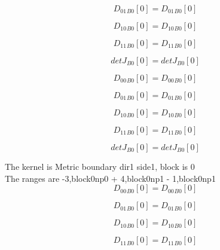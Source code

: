 \documentclass{article}
\begin{document}
\begin{dmath}{D_{01}{_{B0}}}[{0}] = {D_{01}{_{B0}}}[{0}]\end{dmath}

\begin{dmath}{D_{10}{_{B0}}}[{0}] = {D_{10}{_{B0}}}[{0}]\end{dmath}

\begin{dmath}{D_{11}{_{B0}}}[{0}] = {D_{11}{_{B0}}}[{0}]\end{dmath}

\begin{dmath}{detJ{_{B0}}}[{0}] = {detJ{_{B0}}}[{0}]\end{dmath}

\begin{dmath}{D_{00}{_{B0}}}[{0}] = {D_{00}{_{B0}}}[{0}]\end{dmath}

\begin{dmath}{D_{01}{_{B0}}}[{0}] = {D_{01}{_{B0}}}[{0}]\end{dmath}

\begin{dmath}{D_{10}{_{B0}}}[{0}] = {D_{10}{_{B0}}}[{0}]\end{dmath}

\begin{dmath}{D_{11}{_{B0}}}[{0}] = {D_{11}{_{B0}}}[{0}]\end{dmath}

\begin{dmath}{detJ{_{B0}}}[{0}] = {detJ{_{B0}}}[{0}]\end{dmath}

\noindent The kernel is Metric boundary dir1 side1, block is 0\\\noindent The ranges are -3,block0np0 + 4,block0np1 - 1,block0np1\\\begin{dmath}{D_{00}{_{B0}}}[{0}] = {D_{00}{_{B0}}}[{0}]\end{dmath}

\begin{dmath}{D_{01}{_{B0}}}[{0}] = {D_{01}{_{B0}}}[{0}]\end{dmath}

\begin{dmath}{D_{10}{_{B0}}}[{0}] = {D_{10}{_{B0}}}[{0}]\end{dmath}

\begin{dmath}{D_{11}{_{B0}}}[{0}] = {D_{11}{_{B0}}}[{0}]\end{dmath}
\end{document}
